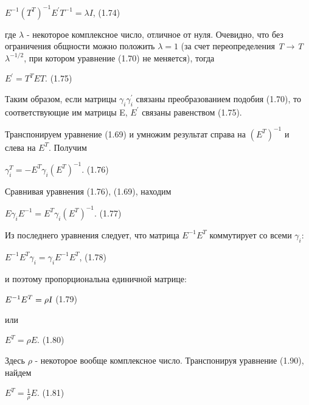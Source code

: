 \documentclass{article}
\begin{document}
{\begin{center}
$E^{-1}(T^{T})^{-1}E^{'}T^{-1}=\lambda I$,       (1.74)\par
\end{center}
где $\lambda$ - некоторое комплексное число, отличное от нуля. Очевидно, что без ограничения общности можно положить $\lambda=1$ (за счет переопределения \textsl{T}$\to$\textsl{T}$\lambda^{-1/2}$, при котором уравнение (1.70) не меняется), тогда\par
\begin{center}
$E^{'}=T^{T}ET.$       (1.75)\par
\end{center}
Таким образом, если матрицы $\gamma_i\gamma^{'}_i$ связаны преобразованием подобия (1.70), то соответствующие им матрицы E, $E^{'}$ связаны равенством (1.75).\par
Транспонируем уравнение (1.69) и умножим результат справа на $(E^{T})^{-1}$ и слева на $E^{T}$. Получим \par
\begin{center}
$\gamma^{T}_i=-E^{T}\gamma_i(E^{T})^{-1}.$       (1.76)\par
\end{center}
Сравнивая уравнения (1.76), (1.69), находим \par
\begin{center}
$E\gamma_i E^{-1}=E^{T}\gamma_i(E^{T})^{-1}$.       (1.77)\par
\end{center}
Из последнего уравнения следует, что матрица $E^{-1}E^{T}$ коммутирует со всеми $\gamma_i$:\par
\begin{center}
$E^{-1}E^{T}\gamma_i=\gamma_i E^{-1}E^{T}$,       (1.78)\par
\end{center}
и поэтому пропорциональна единичной матрице:\par
\begin{center}
$E^{-1}E^{T}=\rho\textsl{I}$     (1.79)\par
\end{center}
или\par
\begin{center}
$E^{T}=\rho E$.     (1.80)\par
\end{center}
Здесь $\rho$ - некоторое вообще комплексное число. Транспонируя уравнение (1.90), найдем\par
\begin{center}
$E^{T}=\frac{1}{\rho}E$.     (1.81)\par

\end{center}}
\end{document}
